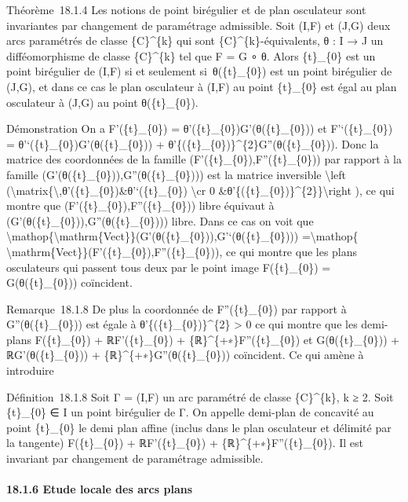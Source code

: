 \documentclass[]{article}
\begin{document}
Théorème~18.1.4 Les notions de point birégulier et de plan osculateur
sont invariantes par changement de paramétrage admissible. Soit (I,F) et
(J,G) deux arcs paramétrés de classe \{C\}\^{}\{k\} qui sont
\{C\}\^{}\{k\}-équivalents, θ : I → J un difféomorphisme de classe
\{C\}\^{}\{k\} tel que F = G ∘ θ. Alors \{t\}\_\{0\} est un point
birégulier de (I,F) si et seulement si~θ(\{t\}\_\{0\}) est un point
birégulier de (J,G), et dans ce cas le plan osculateur à (I,F) au point
\{t\}\_\{0\} est égal au plan osculateur à (J,G) au point
θ(\{t\}\_\{0\}).

Démonstration On a F'(\{t\}\_\{0\}) =
θ'(\{t\}\_\{0\})G'(θ(\{t\}\_\{0\})) et F'`(\{t\}\_\{0\}) =
θ'`(\{t\}\_\{0\})G'(θ(\{t\}\_\{0\})) +
θ'\{(\{t\}\_\{0\})\}\^{}\{2\}G''(θ(\{t\}\_\{0\})). Donc la matrice des
coordonnées de la famille (F'(\{t\}\_\{0\}),F''(\{t\}\_\{0\})) par
rapport à la famille (G'(θ(\{t\}\_\{0\})),G''(θ(\{t\}\_\{0\}))) est la
matrice inversible \textbackslash{}left
(\textbackslash{}matrix\{\textbackslash{},θ'(\{t\}\_\{0\})\&θ'`(\{t\}\_\{0\})
\textbackslash{}cr 0
\&θ'\{(\{t\}\_\{0\})\}\^{}\{2\}\}\textbackslash{}right ), ce qui montre
que (F'(\{t\}\_\{0\}),F''(\{t\}\_\{0\})) libre équivaut à
(G'(θ(\{t\}\_\{0\})),G''(θ(\{t\}\_\{0\}))) libre. Dans ce cas on voit
que
\textbackslash{}mathop\{\textbackslash{}mathrm\{Vect\}\}(G'(θ(\{t\}\_\{0\})),G'`(θ(\{t\}\_\{0\})))
=\textbackslash{}mathop\{
\textbackslash{}mathrm\{Vect\}\}(F'(\{t\}\_\{0\}),F''(\{t\}\_\{0\})), ce
qui montre que les plans osculateurs qui passent tous deux par le point
image F(\{t\}\_\{0\}) = G(θ(\{t\}\_\{0\})) coïncident.

Remarque~18.1.8 De plus la coordonnée de F''(\{t\}\_\{0\}) par rapport à
G''(θ(\{t\}\_\{0\})) est égale à θ'\{(\{t\}\_\{0\})\}\^{}\{2\}
\textgreater{} 0 ce qui montre que les demi-plans F(\{t\}\_\{0\}) +
ℝF'(\{t\}\_\{0\}) + \{ℝ\}\^{}\{+∗\}F''(\{t\}\_\{0\}) et
G(θ(\{t\}\_\{0\})) + ℝG'(θ(\{t\}\_\{0\})) +
\{ℝ\}\^{}\{+∗\}G''(θ(\{t\}\_\{0\})) coïncident. Ce qui amène à
introduire

Définition~18.1.8 Soit Γ = (I,F) un arc paramétré de classe
\{C\}\^{}\{k\}, k ≥ 2. Soit \{t\}\_\{0\} ∈ I un point birégulier de Γ.
On appelle demi-plan de concavité au point \{t\}\_\{0\} le demi plan
affine (inclus dans le plan osculateur et délimité par la tangente)
F(\{t\}\_\{0\}) + ℝF'(\{t\}\_\{0\}) + \{ℝ\}\^{}\{+∗\}F''(\{t\}\_\{0\}).
Il est invariant par changement de paramétrage admissible.

\paragraph{18.1.6 Etude locale des arcs plans}
\end{document}
